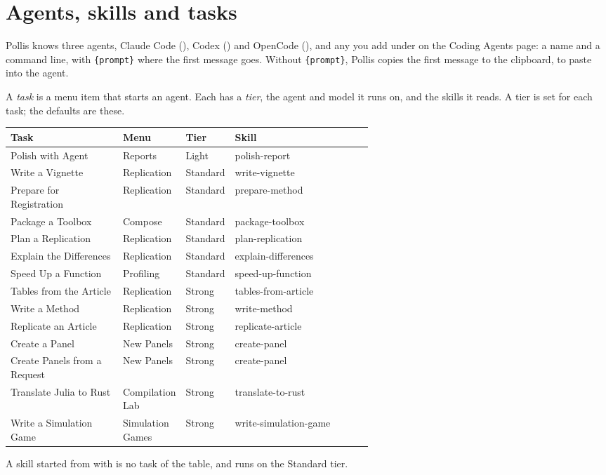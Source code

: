 \section{Agents, skills and tasks}\label{sec:tasks}
Pollis knows three agents, Claude Code (), Codex () and OpenCode (),
and any you add under  on the Coding Agents page: a name and a command line, with \texttt{\small\{prompt\}}
where the first message goes. Without \texttt{\small\{prompt\}}, Pollis copies the first message to the clipboard, to paste
into the agent.

A \emph{task} is a menu item that starts an agent. Each has a \emph{tier}, the agent and model it runs on, and the
skills it reads. A tier is set for each task; the defaults are these.

\begin{center}\small
\renewcommand{\arraystretch}{1.2}
\begin{tabularx}{\linewidth}{@{}p{0.31\linewidth}p{0.17\linewidth}p{0.12\linewidth}L@{}}
\toprule
\textbf{Task} & \textbf{Menu} & \textbf{Tier} & \textbf{Skill}\\
\midrule
Polish with Agent & Reports & Light & polish-report\\
Write a Vignette & Replication & Standard & write-vignette\\
Prepare for Registration & Replication & Standard & prepare-method\\
Package a Toolbox & Compose & Standard & package-toolbox\\
Plan a Replication & Replication & Standard & plan-replication\\
Explain the Differences & Replication & Standard & explain-differences\\
Speed Up a Function & Profiling & Standard & speed-up-function\\
Tables from the Article & Replication & Strong & tables-from-article\\
Write a Method & Replication & Strong & write-method\\
Replicate an Article & Replication & Strong & replicate-article\\
Create a Panel & New Panels & Strong & create-panel\\
Create Panels from a Request & New Panels & Strong & create-panel\\
Translate Julia to Rust & Compilation Lab & Strong & translate-to-rust\\
Write a Simulation Game & Simulation Games & Strong & write-simulation-game\\
\bottomrule
\end{tabularx}
\end{center}
A skill started from  with  is no task of the table, and runs
on the Standard tier.

